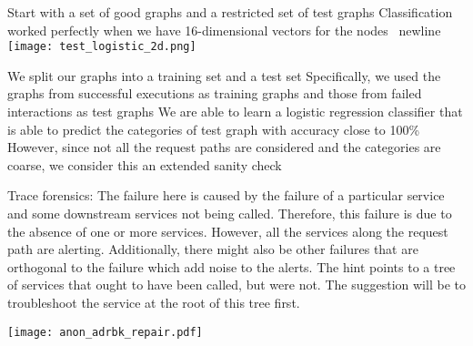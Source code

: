 Start with a set of good graphs and a restricted set of test graphs
Classification worked perfectly when we have 16-dimensional vectors for the nodes \ newline
\texttt{[image: test\_logistic\_2d.png]} \newline

We split our graphs into a training set and a test set
Specifically, we used the graphs from successful executions as training graphs and those from failed interactions as test graphs
We are able to learn a logistic regression classifier that is able to predict the categories of test graph with accuracy close to 100\%
However, since not all the request paths are considered and the categories are coarse, we consider this an extended sanity check

Trace forensics: \newline
The failure here is caused by the failure of a particular service and some downstream services not being called. 
Therefore, this failure is due to the absence of one or more services.
However, all the services along the request path are alerting.
Additionally, there might also be other failures that are orthogonal to the failure which add noise to the alerts.
The hint points to a tree of services that ought to have been called, but were not. The suggestion will be to troubleshoot the service at the root of this tree first.

\texttt{[image: anon\_adrbk\_repair.pdf]} \newline
{}
